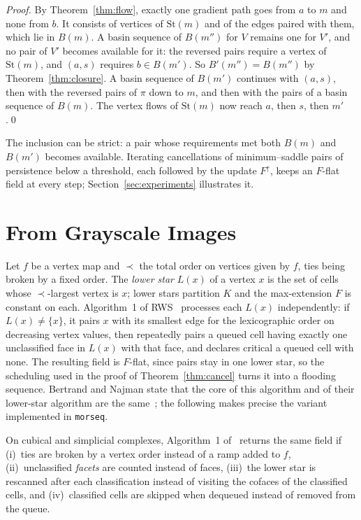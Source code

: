 \documentclass[runningheads]{llncs}
\newcommand{\St}{\mathrm{St}}
\newcommand{\Fup}{F^{\uparrow}}
\newcommand{\morseq}{\texttt{morseq}\xspace}
\begin{document}
\begin{proof}
By Theorem~\ref{thm:flow}, exactly one gradient path goes from $a$ to $m$
and none from $b$. It consists of vertices of $\St(m)$ and of the edges
paired with them, which lie in $B(m)$. A basin sequence of $B(m'')$ for $V$
remains one for $V'$, and no pair of $V'$ becomes available for it: the
reversed pairs require a vertex of $\St(m)$, and $(a,s)$ requires $b\in
B(m')$. So $B'(m'')=B(m'')$ by Theorem~\ref{thm:closure}. A basin sequence
of $B(m')$ continues with $(a,s)$, then with the reversed pairs of $\pi$
down to $m$, and then with the pairs of a basin sequence of $B(m)$. The
vertex flows of $\St(m)$ now reach $a$, then $s$, then $m'$.\qed
\end{proof}

The inclusion can be strict: a pair whose requirements met both $B(m)$ and
$B(m')$ becomes available. Iterating cancellations of minimum--saddle pairs
of persistence below a threshold, each followed by the update $\Fup$, keeps
an $F$-flat field at every step; Section~\ref{sec:experiments} illustrates
it.

\section{From Grayscale Images}\label{sec:lowerstars}

Let $f$ be a vertex map and $\prec$ the total order on vertices given by
$f$, ties being broken by a fixed order. The \emph{lower star} $L(x)$ of a
vertex $x$ is the set of cells whose $\prec$-largest vertex is $x$; lower
stars partition $K$ and the max-extension $F$ is constant on each.
Algorithm~1 of RWS~\cite{RWS11} processes each $L(x)$ independently: if
$L(x)\ne\{x\}$, it pairs $x$ with its smallest edge for the lexicographic
order on decreasing vertex values, then repeatedly pairs a queued cell
having exactly one unclassified face in $L(x)$ with that face, and declares
critical a queued cell with none. The resulting field is $F$-flat, since
pairs stay in one lower star, so the scheduling used in the proof of
Theorem~\ref{thm:cancel} turns it into a flooding sequence. Bertrand and Najman state that the core
of this algorithm and of their lower-star algorithm are the same~\cite{BN25};
the following makes precise the variant implemented in \morseq.

\begin{proposition}\label{prop:rws}
On cubical and simplicial complexes, Algorithm~1 of~\cite{RWS11} returns
the same field if (i)~ties are broken by a vertex order instead of a ramp
added to $f$, (ii)~unclassified \emph{facets} are counted instead of faces,
(iii)~the lower star is rescanned after each classification instead of
visiting the cofaces of the classified cells, and (iv)~classified cells are
skipped when dequeued instead of removed from the queue.
\end{proposition}
\end{document}
